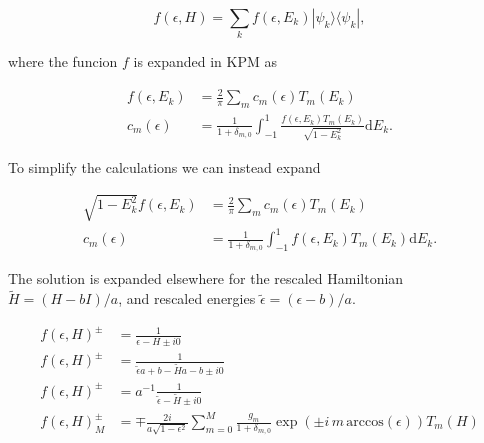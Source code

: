 \documentclass[10pt, onecolumn, aps, prb, superscriptaddress, floatfix, showpacs, notitlepage]{revtex4-1}
\newcommand{\bra}[1]{\langle #1|}
\newcommand{\ket}[1]{|#1\rangle}
\begin{document}
$$
f(\epsilon, H) = \sum_k f(\epsilon, E_k) \ket{\psi_k}\bra{\psi_k},
$$

where the funcion $f$ is expanded in KPM as

\begin{align}
f(\epsilon, E_k) &= \frac{2}{\pi}\sum_m c_m(\epsilon)T_m(E_k)\\
c_m(\epsilon) &=\frac{1}{1+\delta_{m,0}}
\int_{-1}^1 \frac{f(\epsilon, E_k) T_m(E_k)}{\sqrt{1-E_k^2}}\mathrm{d}E_k.
\end{align}

To simplify the calculations we can instead expand

\begin{align}
\sqrt{1-E_k^2}f(\epsilon, E_k) &= \frac{2}{\pi}\sum_m c_m(\epsilon)T_m(E_k)\\
c_m(\epsilon) &=\frac{1}{1+\delta_{m,0}}
\int_{-1}^1 {f(\epsilon, E_k) T_m(E_k)}\mathrm{d}E_k.
\end{align}


The solution is expanded elsewhere\cite{Garcia2014} for the rescaled
Hamiltonian $\tilde{H}=(H-bI)/a$, and rescaled energies
$\tilde{\epsilon}=(\epsilon-b)/a$.

\begin{align}
f(\epsilon, H)^\pm &= \frac{1}{\epsilon-H \pm i0}\\
f(\epsilon, H)^\pm &= \frac{1}{\tilde{\epsilon}a+b-\tilde{H}a-b \pm i0}\\
f(\epsilon, H)^\pm &= a^{-1}\frac{1}{\tilde{\epsilon}-\tilde{H} \pm i0}\\
f(\epsilon, H)^\pm_M &= \mp \frac{2i}{a\sqrt{1-\epsilon^2}}
\sum_{m=0}^{M}\frac{g_m}{1+\delta_{m,0}}
\exp(\pm i\,m\,\mathrm{arccos}(\epsilon)) T_m(H)
\end{align}


%
\end{document}

